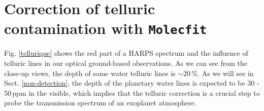 \documentclass{aa}
\begin{document}

\section{Correction of telluric contamination with \tt Molecfit}
\label{molecfit}
 Fig. \ref{tellurique} shows the red part of a HARPS spectrum and the influence of telluric lines in our optical ground-based observations. As we can see from the close-up views, the depth of some water telluric lines is $\sim$20\,$\%$. As we will see in Sect. \ref{non-detection}, the depth of the planetary water lines is expected to be 30 - 50\,ppm in the visible, which implies that the telluric correction is a  crucial step to probe the transmission spectrum of an exoplanet atmosphere.
\begin{figure*}
\caption[Influence des telluriques]{Influence of telluric lines on the spectrum of HD\,189733 obtained with HARPS on the red part of the CCD (5\,380 to 6\,900\,\AA) for the night of 19 July 2007. The upper panel (a, b, c, d, e) is the observed stellar spectrum with telluric contamination. Panel (a', b', c', d', e') is the best fit telluric model obtained with \texttt{Molecfit}  with H$_{2}$O in blue and O$_{2}$ in red. Panels (b, b'), (c, c'), (d, d') and (e, e') are close-up views of the green zones in panel (a,a'). These contain the strongest telluric bands in the visible (from left to right : H$_{2}$O (203-000, 302-000, 321-000) band at $\sim$5\,900\,\AA\ around the Na doublet, O$_{2}$ $\gamma$ band at $\sim$6\,200\,\AA\ , H$_{2}$O (311-000) band at $\sim$6\,500\,\AA\ and O$_{2}$ B band at $\sim$6\,900\,\AA\ ).}
\label{tellurique}
\end{figure*}
\\
\end{document}
